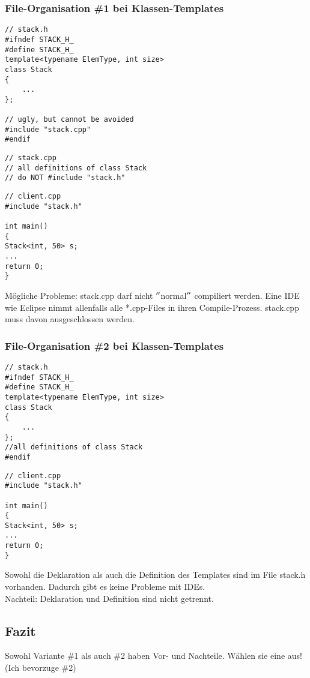 \subsubsection{File-Organisation \#1 bei Klassen-Templates}
\vspace{-\baselineskip}
\begin{multicols}{2}
\begin{lstlisting}
// stack.h
#ifndef STACK_H_
#define STACK_H_
template<typename ElemType, int size>
class Stack
{
	...
};

// ugly, but cannot be avoided
#include "stack.cpp"
#endif
\end{lstlisting}
\vfill\null
\columnbreak
\begin{lstlisting}
// stack.cpp
// all definitions of class Stack
// do NOT #include "stack.h"
\end{lstlisting}
\vspace{-\baselineskip}
\begin{lstlisting}
// client.cpp
#include "stack.h"

int main()
{
Stack<int, 50> s;
...
return 0;
}
\end{lstlisting}
\end{multicols}
\vspace{-\baselineskip}
\begin{achtung}
	Mögliche Probleme: stack.cpp darf nicht $"$normal$"$ compiliert werden. Eine IDE wie Eclipse nimmt allenfalls alle *.cpp-Files in ihren Compile-Prozess. stack.cpp muss davon ausgeschlossen werden.
\end{achtung}

\subsubsection{File-Organisation \#2 bei Klassen-Templates}
\vspace{-\baselineskip}
\begin{multicols}{2}
\begin{lstlisting}
// stack.h
#ifndef STACK_H_
#define STACK_H_
template<typename ElemType, int size>
class Stack
{
	...
};
//all definitions of class Stack
#endif
\end{lstlisting}
\vfill\null
\columnbreak
\begin{lstlisting}
// client.cpp
#include "stack.h"

int main()
{
Stack<int, 50> s;
...
return 0;
}
\end{lstlisting}
\end{multicols}
\vspace{-\baselineskip}
\begin{hinweis}
Sowohl die Deklaration als auch die Definition des Templates sind im File stack.h vorhanden. Dadurch gibt es keine Probleme mit IDEs.\\
Nachteil: Deklaration und Definition sind nicht getrennt.
\end{hinweis}

\subsection{Fazit}
Sowohl Variante \#1 als auch \#2 haben Vor- und Nachteile. Wählen sie eine aus! (Ich bevorzuge \#2)